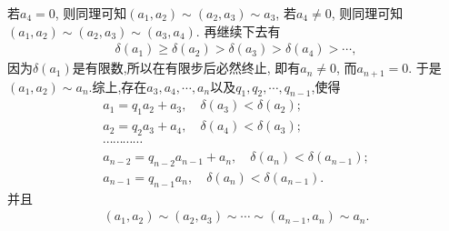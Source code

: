 \documentclass[../../main.tex]{subfiles}%
\begin{document}
\begin{solution}
若$a_4=0$, 则同理可知$(a_1,a_2)\sim(a_2,a_3)\sim a_3$, 若$a_4\neq 0$, 则同理可知$(a_1,a_2)\sim(a_2,a_3)\sim(a_3,a_4)$. 再继续下去有
\begin{align*}
\delta(a_1)\geqslant\delta(a_2)>\delta(a_3)>\delta(a_4)>\cdots,
\end{align*}
因为$\delta(a_1)$是有限数,所以在有限步后必然终止, 即有$a_n\neq 0$, 而$a_{n+1}=0$. 于是$(a_1,a_2)\sim a_n$.综上,存在$a_3,a_4,\cdots,a_n$以及$q_1,q_2,\cdots,q_{n-1}$,使得
\begin{gather*}
a_1=q_1a_2+a_3,\quad \delta \left( a_3 \right) <\delta \left( a_2 \right) ;
\\
a_2=q_2a_3+a_4,\quad \delta \left( a_4 \right) <\delta \left( a_3 \right) ;
\\
\cdots \cdots \cdots \cdots 
\\
a_{n-2}=q_{n-2}a_{n-1}+a_n,\quad \delta \left( a_n \right) <\delta \left( a_{n-1} \right) ;
\\
a_{n-1}=q_{n-1}a_n,\quad \delta \left( a_n \right) <\delta \left( a_{n-1} \right) .
\end{gather*}
并且
\begin{align*}
\left( a_1,a_2 \right) \sim \left( a_2,a_3 \right) \sim \cdots \sim \left( a_{n-1},a_n \right) \sim a_n.
\end{align*}

\end{solution}
\end{document}
